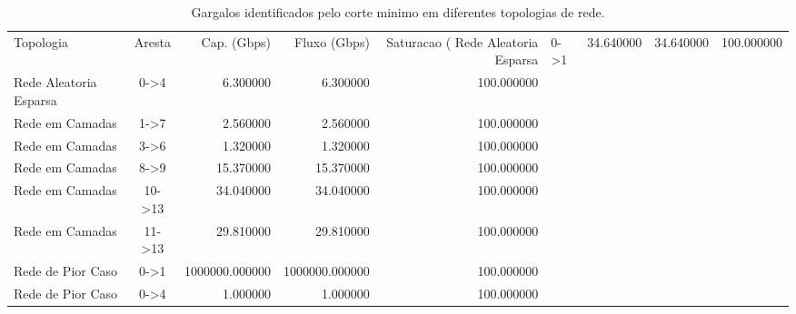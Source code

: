 \begin{table}
\caption{Gargalos identificados pelo corte minimo em diferentes topologias de rede.}
\label{tab:gargalos}
\begin{tabular}{l c r r r}
\toprule
Topologia & Aresta & Cap. (Gbps) & Fluxo (Gbps) & Saturacao (%
\midrule
Rede Aleatoria Esparsa & 0->1 & 34.640000 & 34.640000 & 100.000000 \\
Rede Aleatoria Esparsa & 0->4 & 6.300000 & 6.300000 & 100.000000 \\
Rede em Camadas & 1->7 & 2.560000 & 2.560000 & 100.000000 \\
Rede em Camadas & 3->6 & 1.320000 & 1.320000 & 100.000000 \\
Rede em Camadas & 8->9 & 15.370000 & 15.370000 & 100.000000 \\
Rede em Camadas & 10->13 & 34.040000 & 34.040000 & 100.000000 \\
Rede em Camadas & 11->13 & 29.810000 & 29.810000 & 100.000000 \\
Rede de Pior Caso & 0->1 & 1000000.000000 & 1000000.000000 & 100.000000 \\
Rede de Pior Caso & 0->4 & 1.000000 & 1.000000 & 100.000000 \\
\bottomrule
\end{tabular}
\end{table}
